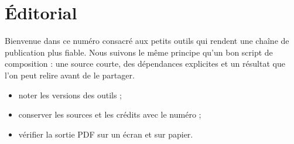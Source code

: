 \section{Éditorial}

Bienvenue dans ce numéro consacré aux petits outils qui rendent une chaîne de
publication plus fiable. Nous suivons le même principe qu'un bon script de
composition : une source courte, des dépendances explicites et un résultat que
l'on peut relire avant de le partager.

\begin{itemize}
  \item noter les versions des outils ;
  \item conserver les sources et les crédits avec le numéro ;
  \item vérifier la sortie PDF sur un écran et sur papier.
\end{itemize}
